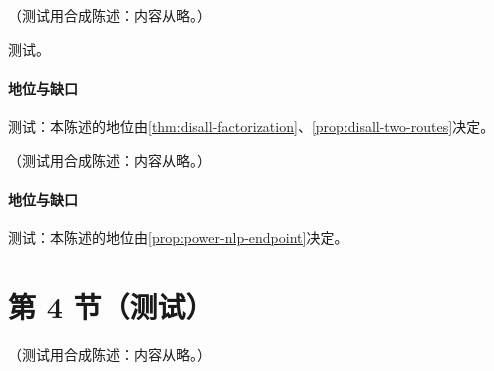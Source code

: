 \begin{proposition}\label{prop:thr-dis}
（测试用合成陈述：内容从略。）
\end{proposition}
\begin{proofsketch}测试。\end{proofsketch}
\paragraph{地位与缺口}测试：本陈述的地位由\cref{thm:disall-factorization}、\cref{prop:disall-two-routes}决定。

\begin{proposition}\label{prop:thr-nlp}
（测试用合成陈述：内容从略。）
\end{proposition}
\paragraph{地位与缺口}测试：本陈述的地位由\cref{prop:power-nlp-endpoint}决定。

\section{第 4 节（测试）}\label{sec:thr-prescriptions}

\begin{example}\label{ex:thr-dy}
（测试用合成陈述：内容从略。）
\end{example}
